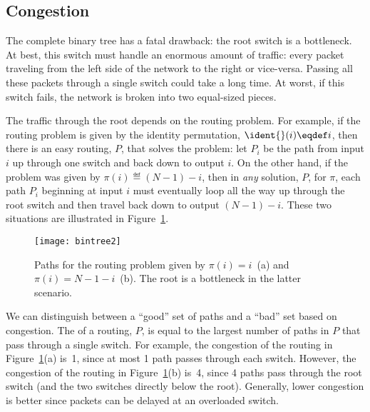 \subsection{Congestion}

The complete binary tree has a fatal drawback: the root switch is a
bottleneck.  At best, this switch must handle an enormous amount of
traffic: every packet traveling from the left side of the network to the
right or vice-versa.  Passing all these packets through a single switch
could take a long time.  At worst, if this switch fails, the network is
broken into two equal-sized pieces.

The traffic through the root depends on the routing problem.  For
example, if the routing problem is given by the identity permutation,
 $\ident{}(i) \eqdef i$, then
there is an easy routing, $P$, that solves the problem: let $P_i$ be
the path from input $i$ up through one switch and back down to output
$i$.  On the other hand, if the problem was given by $\pi(i) \eqdef (N
- 1) - i$, then in \emph{any} solution, $P$, for $\pi$, each path
$P_i$ beginning at input $i$ must eventually loop all the way up
through the root switch and then travel back down to output $(N - 1) -
i$.  These two situations are illustrated in Figure~\ref{fig:6EJ}.

\begin{figure}


\texttt{[image: bintree2]}

\caption{Paths for the routing problem given by $\pi(i) = i$~(a) and
  $\pi(i) = N - 1 - i$~(b).  The root is a bottleneck in the latter
  scenario.}

\label{fig:6EJ}

\end{figure}

We can distinguish between a ``good'' set of paths and a ``bad'' set
based on congestion.  The  of a routing, $P$, is
equal to the largest number of paths in $P$ that pass through a single
switch.  For example, the congestion of the routing in
Figure~\ref{fig:6EJ}(a) is~1, since at most 1 path passes through each
switch.  However, the congestion of the routing in
Figure~\ref{fig:6EJ}(b) is~4, since 4 paths pass through the root
switch (and the two switches directly below the root).  Generally,
lower congestion is better since packets can be delayed at an
overloaded switch.

